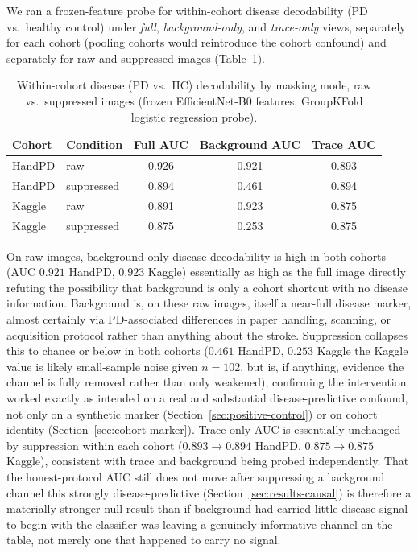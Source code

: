 \documentclass[3p,final,10pt]{elsarticle}
\begin{document}
We ran a frozen-feature probe for within-cohort disease decodability
(PD vs.\ healthy control) under \textit{full}, \textit{background-only},
and \textit{trace-only} views, separately for each cohort (pooling cohorts
would reintroduce the cohort confound) and separately for raw and
suppressed images (Table~\ref{tab:background-disease}).

\begin{table}[H]
\centering
\caption{Within-cohort disease (PD vs.\ HC) decodability by masking mode,
raw vs.\ suppressed images (frozen EfficientNet-B0 features, GroupKFold
logistic regression probe).}
\label{tab:background-disease}
\begin{tabular}{llccc}
\toprule
Cohort & Condition & Full AUC & Background AUC & Trace AUC \\
\midrule
HandPD & raw        & 0.926 & 0.921 & 0.893 \\
HandPD & suppressed & 0.894 & 0.461 & 0.894 \\
Kaggle & raw        & 0.891 & 0.923 & 0.875 \\
Kaggle & suppressed & 0.875 & 0.253 & 0.875 \\
\bottomrule
\end{tabular}
\end{table}

On raw images, background-only disease decodability is high in both
cohorts (AUC $0.921$ HandPD, $0.923$ Kaggle) essentially as high as the
full image directly refuting the possibility that background is only a
cohort shortcut with no disease information. Background is, on these raw
images, itself a near-full disease marker, almost certainly via
PD-associated differences in paper handling, scanning, or acquisition
protocol rather than anything about the stroke. Suppression collapses this
to chance or below in both cohorts ($0.461$ HandPD, $0.253$ Kaggle
the Kaggle value is likely small-sample noise given $n=102$, but is, if
anything, evidence the channel is fully removed rather than only
weakened), confirming the intervention worked exactly as intended on a
real and substantial disease-predictive confound, not only on a synthetic
marker (Section~\ref{sec:positive-control}) or on cohort identity
(Section~\ref{sec:cohort-marker}). Trace-only AUC is essentially unchanged by
suppression within each cohort ($0.893\to0.894$ HandPD, $0.875\to0.875$
Kaggle), consistent with trace and background being probed independently.
That the honest-protocol AUC still does not move after suppressing a
background channel this strongly disease-predictive
(Section~\ref{sec:results-causal}) is therefore a materially stronger
null result than if background had carried little disease signal to begin
with the classifier was leaving a genuinely informative channel on the
table, not merely one that happened to carry no signal.
\end{document}
